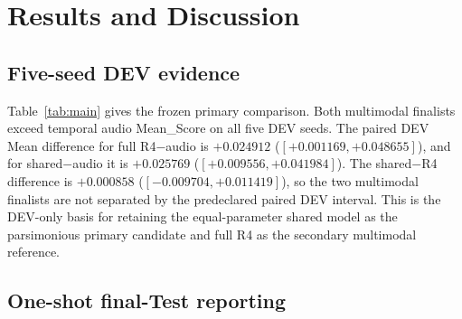 \section{Results and Discussion}
\label{sec:results}

\subsection{Five-seed DEV evidence}

Table~\ref{tab:main} gives the frozen primary comparison. Both multimodal finalists exceed temporal audio Mean\_Score on all five DEV seeds. The paired DEV Mean difference for full R4$-$audio is $+0.024912$ ($[+0.001169,+0.048655]$), and for shared$-$audio it is $+0.025769$ ($[+0.009556,+0.041984]$). The shared$-$R4 difference is $+0.000858$ ($[-0.009704,+0.011419]$), so the two multimodal finalists are not separated by the predeclared paired DEV interval. This is the DEV-only basis for retaining the equal-parameter shared model as the parsimonious primary candidate and full R4 as the secondary multimodal reference.

\begin{table}[t]
\centering\small
\caption{Frozen five-seed main comparison. DEV cells are D/P/Mean; final-Test cells are Mean with predeclared descriptive 95\% intervals. Shared fusion's primary role was fixed before Test reporting.}
\label{tab:main}
\end{table}

\subsection{One-shot final-Test reporting}

